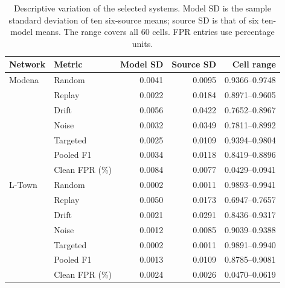 \begin{table}[tbp]
\centering\small
\caption[Model and source variation of the selected systems]{Descriptive variation of the selected systems. Model SD is the sample standard deviation of ten six-source means; source SD is that of six ten-model means. The range covers all 60 cells. FPR entries use percentage units.}
\label{tab:variation}
\begin{tabular}{@{}llrrr@{}}
\toprule
Network & Metric & Model SD & Source SD & Cell range\\
\midrule
Modena & Random & 0.0041 & 0.0095 & 0.9366--0.9748\\
 & Replay & 0.0022 & 0.0184 & 0.8971--0.9605\\
 & Drift & 0.0056 & 0.0422 & 0.7652--0.8967\\
 & Noise & 0.0032 & 0.0349 & 0.7811--0.8992\\
 & Targeted & 0.0025 & 0.0109 & 0.9394--0.9804\\
 & Pooled F1 & 0.0034 & 0.0118 & 0.8419--0.8896\\
 & Clean FPR (\%) & 0.0084 & 0.0077 & 0.0429--0.0941\\
L-Town & Random & 0.0002 & 0.0011 & 0.9893--0.9941\\
 & Replay & 0.0050 & 0.0173 & 0.6947--0.7657\\
 & Drift & 0.0021 & 0.0291 & 0.8436--0.9317\\
 & Noise & 0.0012 & 0.0085 & 0.9039--0.9388\\
 & Targeted & 0.0002 & 0.0011 & 0.9891--0.9940\\
 & Pooled F1 & 0.0013 & 0.0109 & 0.8785--0.9081\\
 & Clean FPR (\%) & 0.0024 & 0.0026 & 0.0470--0.0619\\
\bottomrule
\end{tabular}
\end{table}

